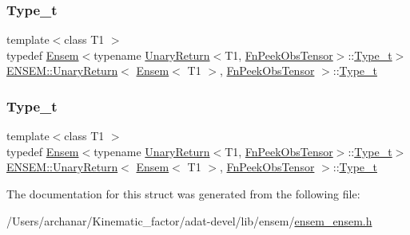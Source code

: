 \subsubsection{\texorpdfstring{Type\_t}{Type\_t}\hspace{0.1cm}{\footnotesize\ttfamily [2/3]}}
{\footnotesize\ttfamily template$<$class T1 $>$ \\
typedef \mbox{\hyperlink{classENSEM_1_1Ensem}{Ensem}}$<$typename \mbox{\hyperlink{structENSEM_1_1UnaryReturn}{Unary\+Return}}$<$T1, \mbox{\hyperlink{structENSEM_1_1FnPeekObsTensor}{Fn\+Peek\+Obs\+Tensor}}$>$\+::\mbox{\hyperlink{structENSEM_1_1UnaryReturn_3_01Ensem_3_01T1_01_4_00_01FnPeekObsTensor_01_4_a6f60fb6656ccc4fbc31cc64aa1face1f}{Type\+\_\+t}}$>$ \mbox{\hyperlink{structENSEM_1_1UnaryReturn}{E\+N\+S\+E\+M\+::\+Unary\+Return}}$<$ \mbox{\hyperlink{classENSEM_1_1Ensem}{Ensem}}$<$ T1 $>$, \mbox{\hyperlink{structENSEM_1_1FnPeekObsTensor}{Fn\+Peek\+Obs\+Tensor}} $>$\+::\mbox{\hyperlink{structENSEM_1_1UnaryReturn_3_01Ensem_3_01T1_01_4_00_01FnPeekObsTensor_01_4_a6f60fb6656ccc4fbc31cc64aa1face1f}{Type\+\_\+t}}}

\mbox{\label{structENSEM_1_1UnaryReturn_3_01Ensem_3_01T1_01_4_00_01FnPeekObsTensor_01_4_a6f60fb6656ccc4fbc31cc64aa1face1f}} 
\subsubsection{\texorpdfstring{Type\_t}{Type\_t}\hspace{0.1cm}{\footnotesize\ttfamily [3/3]}}
{\footnotesize\ttfamily template$<$class T1 $>$ \\
typedef \mbox{\hyperlink{classENSEM_1_1Ensem}{Ensem}}$<$typename \mbox{\hyperlink{structENSEM_1_1UnaryReturn}{Unary\+Return}}$<$T1, \mbox{\hyperlink{structENSEM_1_1FnPeekObsTensor}{Fn\+Peek\+Obs\+Tensor}}$>$\+::\mbox{\hyperlink{structENSEM_1_1UnaryReturn_3_01Ensem_3_01T1_01_4_00_01FnPeekObsTensor_01_4_a6f60fb6656ccc4fbc31cc64aa1face1f}{Type\+\_\+t}}$>$ \mbox{\hyperlink{structENSEM_1_1UnaryReturn}{E\+N\+S\+E\+M\+::\+Unary\+Return}}$<$ \mbox{\hyperlink{classENSEM_1_1Ensem}{Ensem}}$<$ T1 $>$, \mbox{\hyperlink{structENSEM_1_1FnPeekObsTensor}{Fn\+Peek\+Obs\+Tensor}} $>$\+::\mbox{\hyperlink{structENSEM_1_1UnaryReturn_3_01Ensem_3_01T1_01_4_00_01FnPeekObsTensor_01_4_a6f60fb6656ccc4fbc31cc64aa1face1f}{Type\+\_\+t}}}



The documentation for this struct was generated from the following file\+:\begin{DoxyCompactItemize}
\item 
/\+Users/archanar/\+Kinematic\+\_\+factor/adat-\/devel/lib/ensem/\mbox{\hyperlink{adat-devel_2lib_2ensem_2ensem__ensem_8h}{ensem\+\_\+ensem.\+h}}\end{DoxyCompactItemize}

